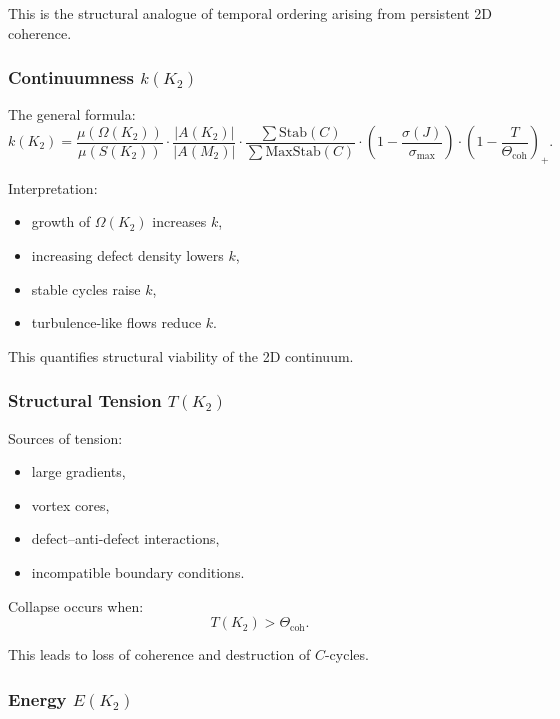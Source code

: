 This is the structural analogue of temporal ordering arising from
persistent 2D coherence.

\subsubsection{Continuumness \texorpdfstring{$k(K_2)$}{k(K_2)}}

The general formula:
\[
k(K_2) =
\frac{\mu(\Omega(K_2))}{\mu(S(K_2))}
\cdot
\frac{|A(K_2)|}{|A(M_2)|}
\cdot
\frac{\sum \mathrm{Stab}(C)}{\sum \mathrm{MaxStab}(C)}
\cdot
\left(1 - \frac{\sigma(J)}{\sigma_{\max}}\right)
\cdot
\left(1 - \frac{T}{\Theta_{\mathrm{coh}}}\right)_+.
\]

Interpretation:
\begin{itemize}
    \item growth of $\Omega(K_2)$ increases $k$,
    \item increasing defect density lowers $k$,
    \item stable cycles raise $k$,
    \item turbulence-like flows reduce $k$.
\end{itemize}

This quantifies structural viability of the 2D continuum.

\subsubsection{Structural Tension \texorpdfstring{$T(K_2)$}{T(K_2)}}

Sources of tension:
\begin{itemize}
    \item large gradients,
    \item vortex cores,
    \item defect–anti-defect interactions,
    \item incompatible boundary conditions.
\end{itemize}

Collapse occurs when:
\[
T(K_2) > \Theta_{\mathrm{coh}}.
\]

This leads to loss of coherence and destruction of $C$-cycles.

\subsubsection{Energy \texorpdfstring{$E(K_2)$}{E(K_2)}}

